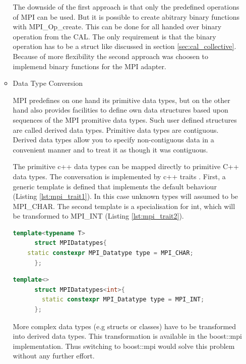 \begin{itemize}
\begin{itemize}
    The downside of the first approach is that only the predefined
    operations of MPI can be used. But it is possible to create
    abitrary binary functions with MPI\_Op\_create. This can be done
    for all handed over binary operation from the CAL. The only
    requirement is that the binary operation has to be a struct like
    discussed in section \ref{sec:cal_collective}.  Because of more
    flexibility the second approach was choosen to implemend binary
    functions for the MPI adapter.

  \item  Data Type Conversion 

    MPI predefines on one hand its primitive data types, but on the
    other hand also provides facilities to define own data structures
    based upon sequences of the MPI promitive data types. Such user
    defined structures are called derived data types. Primitive data
    types are contiguous. Derived data types allow you to specify
    non-contiguous data in a convenient manner and to treat it as
    though it was contiguous.

    The primitive c++ data types can be mapped directly to primitive
    C++ data types. The conversation is implemented by c++ traits .
    First, a generic template is defined that implements the default
    behaviour (Listing \ref{lst:mpi_trait1}). In this case unknown
    types will assumed to be MPI\_CHAR. The second template is a
    specialisation for int, which will be transformed to MPI\_INT
    (Listing \ref{lst:mpi_trait2}).


    \begin{lstlisting}[language=C++]
      template<typename T>
      struct MPIDatatypes{
	static constexpr MPI_Datatype type = MPI_CHAR;
      };
    \end{lstlisting}
    \label{lst:mpi_trait1}

    \begin{lstlisting}[language=C++]
      template<>
      struct MPIDatatypes<int>{
    	static constexpr MPI_Datatype type = MPI_INT;
      };

    \end{lstlisting}
    \label{lst:mpi_trait2}


    More complex data types (e.g structs or classes) have to be
    transformed into derived data types. This transformation is
    available in the boost::mpi implementation. Thus switching to
    boost::mpi \cite{ref:boost::mpi} would solve this problem without
    any further effort.


\end{itemize}
\end{itemize}
